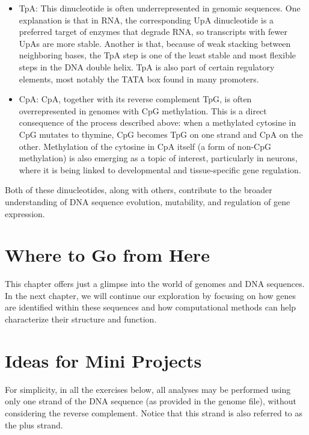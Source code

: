 \begin{itemize}
    \item TpA: This dinucleotide is often underrepresented in genomic sequences. One explanation is that in RNA, the corresponding UpA dinucleotide is a preferred target of enzymes that degrade RNA, so transcripts with fewer UpAs are more stable. Another is that, because of weak stacking between neighboring bases, the TpA step is one of the least stable and most flexible steps in the DNA double helix. TpA is also part of certain regulatory elements, most notably the TATA box found in many promoters.

    \item CpA: CpA, together with its reverse complement TpG, is often overrepresented in genomes with CpG methylation. This is a direct consequence of the process described above: when a methylated cytosine in CpG mutates to thymine, CpG becomes TpG on one strand and CpA on the other. Methylation of the cytosine in CpA itself (a form of non-CpG methylation) is also emerging as a topic of interest, particularly in neurons, where it is being linked to developmental and tissue-specific gene regulation.
\end{itemize}

Both of these dinucleotides, along with others, contribute to the broader understanding of DNA sequence evolution, mutability, and regulation of gene expression.

\section{Where to Go from Here}

This chapter offers just a glimpse into the world of genomes and DNA sequences. In the next chapter, we will continue our exploration by focusing on how genes are identified within these sequences and how computational methods can help characterize their structure and function.

\section*{Ideas for Mini Projects}

For simplicity, in all the exercises below, all analyses may be performed using only one strand of the DNA sequence (as provided in the genome file), without considering the reverse complement. Notice that this strand is also referred to as the plus strand.

